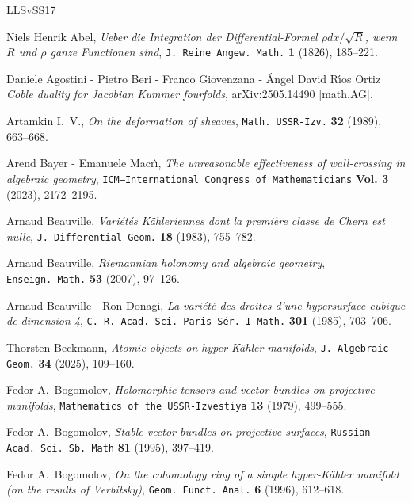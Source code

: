 \documentclass[11pt]{amsart}
\theoremstyle{definition}
\theoremstyle{remark}
\begin{document}

\begin{thebibliography}{LLSvSS17} 


 Niels Henrik Abel, \emph{Ueber die Integration der Differential-Formel $\rho dx/\sqrt{R}$, wenn $R$ und $\rho$
ganze Functionen sind\/}, {\tt J. Reine Angew. Math.} {\bf 1} (1826),  185--221.

 Daniele Agostini - Pietro Beri - Franco Giovenzana - \'Angel David R\'\i os Ortiz
\emph{Coble duality for Jacobian Kummer fourfolds\/}, 
arXiv:2505.14490  [math.AG].


 Artamkin I.~V., \emph{On the deformation of sheaves\/}, 
{\tt Math. USSR-Izv.}  {\bf 32} (1989), 663--668.

 Arend Bayer - Emanuele Macr\`\i, \emph{The unreasonable effectiveness of wall-crossing in algebraic geometry\/}, 
{\tt ICM—International Congress of Mathematicians}  {\bf Vol. 3} (2023), 2172--2195.
 
 Arnaud Beauville, \emph{Vari\'et\'es K\"ahleriennes dont la premi\`ere classe de Chern est 
nulle\/}, 
{\tt J.~Differential Geom.}  {\bf  18} (1983),  755--782.


 Arnaud Beauville, \emph{Riemannian holonomy and algebraic geometry\/}, 
{\tt  Enseign.~Math.}  {\bf   53} (2007),   97--126.

 
 Arnaud Beauville - Ron Donagi, \emph{La vari\'et\'e des droites d'une
  hypersurface cubique de dimension 4\/}, 
{\tt  C.~R.~Acad.~Sci.~Paris S\'er. I  Math.}  {\bf  301} (1985),  703--706. 


 Thorsten Beckmann, \emph{Atomic objects on hyper-K\"ahler manifolds\/}, 
{\tt J.~Algebraic Geom.}  {\bf  34} (2025),  109--160.

 Fedor A.~Bogomolov, \emph{Holomorphic tensors and vector bundles on projective manifolds\/}, 
{\tt  Mathematics of the USSR-Izvestiya} {\bf 13} (1979), 499--555.



 Fedor A.~Bogomolov, \emph{Stable vector bundles on projective surfaces\/}, 
{\tt  Russian Acad.~Sci.~Sb.~Math} {\bf  81} (1995),  397--419.


Fedor A.~Bogomolov, \emph{On the cohomology ring of a simple hyper-K\"ahler
  manifold (on the results of {V}erbitsky)\/}, 
{\tt   Geom.~Funct.~Anal.} {\bf 6}  (1996), 612--618.


\end{thebibliography}
\end{document}
